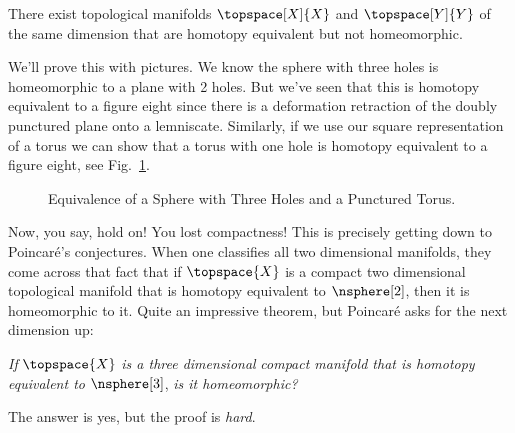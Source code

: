 \documentclass[oneside]{book}                                                  %
\begin{document}
                \begin{theorem}
                    There exist topological manifolds $\topspace[X]{X}$ and
                    $\topspace[Y]{Y}$ of the same dimension that are homotopy
                    equivalent but not homeomorphic.
                \end{theorem}
                We'll prove this with pictures. We know the sphere with three
                holes is homeomorphic to a plane with 2 holes. But we've seen
                that this is homotopy equivalent to a figure eight since there
                is a deformation retraction of the doubly punctured plane onto
                a lemniscate. Similarly, if we use our square representation of
                a torus we can show that a torus with one hole is homotopy
                equivalent to a figure eight, see
                Fig.~\ref{fig:HE_Torus_Sphere_Fig_8}.
                \begin{figure}[H]
                        \centering
                        \captionsetup{type=figure}
                        \resizebox{\textwidth}{!}{%
                        }
                        \caption{%
                            Equivalence of a Sphere with Three Holes and a
                            Punctured Torus.%
                        }
                        \label{fig:HE_Torus_Sphere_Fig_8}
                \end{figure}
                Now, you say, hold on! You lost compactness! This is precisely
                getting down to Poincar\'{e}'s conjectures. When one classifies
                all two dimensional manifolds, they come across that fact that
                if $\topspace{X}$ is a compact two dimensional topological
                manifold that is homotopy equivalent to $\nsphere[2]$, then it
                is homeomorphic to it. Quite an impressive theorem, but
                Poincar\'{e} asks for the next dimension up:
                \begin{center}
                    \textit{If} $\topspace{X}$ \textit{is a three dimensional}
                    \textit{compact manifold that is homotopy equivalent to}
                    $\nsphere[3]$, \textit{is it homeomorphic?}
                \end{center}
                The answer is yes, but the proof is \textit{hard}.
                \par\hfill\par
\end{document}
